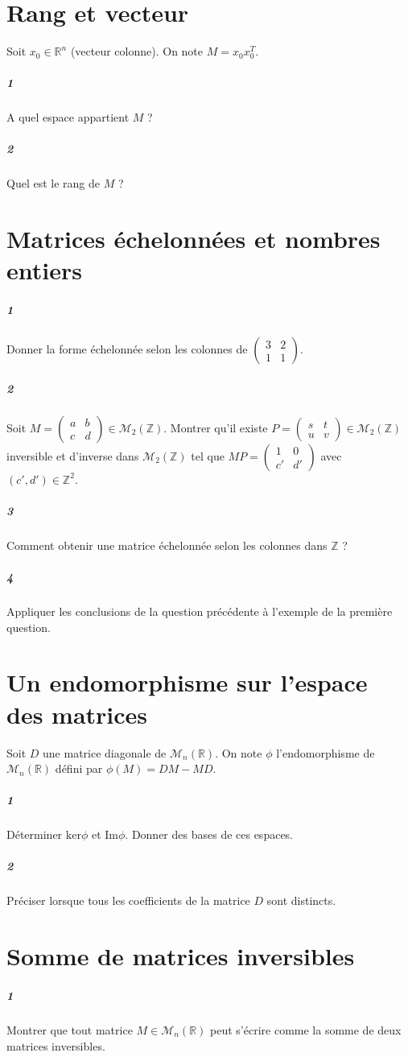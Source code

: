 \documentclass[10pt,a4paper]{article}
\begin{document}
\section{Rang et vecteur}
Soit $x_0 \in \mathbb{R}^n$ (vecteur colonne). On note $M = x_0 x_0^T$.
\subparagraph{1}A quel espace appartient $M$ ?
\subparagraph{2}Quel est le rang de $M$ ?

\section{Matrices échelonnées et nombres entiers}
\subparagraph{1}Donner la forme échelonnée selon les colonnes de $\left( \begin{matrix} 3 & 2 \\1 & 1\end{matrix}\right)$.
\subparagraph{2} Soit $M=\left( \begin{matrix} a & b \\ c & d \end{matrix} \right) \in \mathcal{M}_2 \left( \mathbb{Z} \right)$. Montrer qu'il existe $P=\left( \begin{matrix} s & t \\ u & v \end{matrix} \right) \in \mathcal{M}_2 \left( \mathbb{Z} \right)$ inversible et d'inverse dans $\mathcal{M}_2 \left( \mathbb{Z} \right)$ tel que $MP = \left( \begin{matrix} 1 & 0 \\ c' & d' \end{matrix} \right)$ avec $(c',d') \in \mathbb{Z}^2$.
\subparagraph{3}Comment obtenir une matrice échelonnée selon les colonnes dans $\mathbb{Z}$ ?
\subparagraph{4}Appliquer les conclusions de la question précédente à l'exemple de la première question.

\section{Un endomorphisme sur l'espace des matrices}
Soit $D$ une matrice diagonale de $\mathcal{M}_n \left( \mathbb{R} \right)$. On note $\phi$ l'endomorphisme de $\mathcal{M}_n \left( \mathbb{R} \right)$ défini par $\phi(M) =DM-MD$.
\subparagraph{1} Déterminer $\text{ker} \phi$ et $\text{Im} \phi$. Donner des bases de ces espaces.
\subparagraph{2} Préciser lorsque tous les coefficients de la matrice $D$ sont distincts.

\section{Somme de matrices inversibles}
\subparagraph{1}Montrer que tout matrice $M \in \mathcal{M}_n \left( \mathbb{R} \right)$ peut s'écrire comme la somme de deux matrices inversibles.
\end{document}
